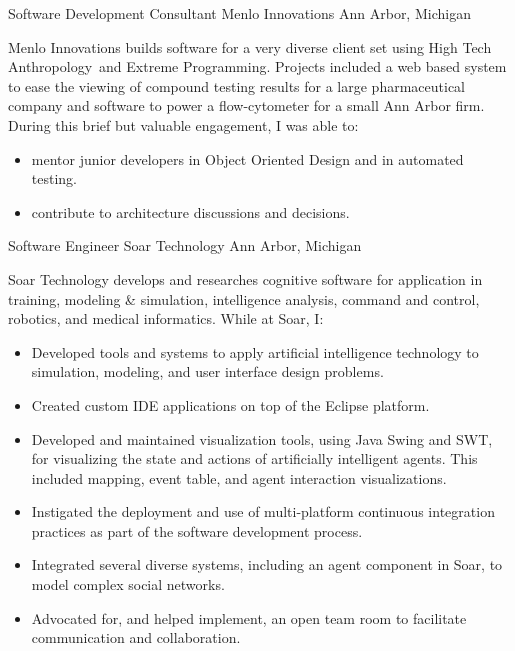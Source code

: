\documentclass[11pt,letterpaper]{moderncv}
\begin{document}
  {Software Development Consultant}
         {Menlo Innovations} {Ann Arbor, Michigan} {}
{
  Menlo Innovations builds software for a very diverse client set
  using High Tech Anthropology\textregistered \ and Extreme
  Programming.  Projects included a web based system to ease the
  viewing of compound testing results for a large pharmaceutical
  company and software to power a flow-cytometer for a small Ann Arbor
  firm.\newline
  During this brief but valuable engagement, I was able to:
  \begin{itemize}
    \item mentor junior developers in Object Oriented Design and in
      automated testing.
    \item contribute to architecture discussions and decisions.
  \end{itemize}
}

 {Software Engineer} {Soar Technology}
         {Ann Arbor, Michigan} {}
{
  Soar Technology develops and researches cognitive software for
  application in training, modeling \& simulation, intelligence
  analysis, command and control, robotics, and medical
  informatics.\newline
  While at Soar, I:
  \begin{itemize}
  \item Developed tools and systems to apply artificial intelligence
    technology to simulation, modeling, and user interface design
    problems.
   \item Created custom IDE applications on top of the Eclipse platform.
   \item Developed and maintained visualization tools, using Java
     Swing and SWT, for visualizing the state and actions of
     artificially intelligent agents. This included mapping, event
     table, and agent interaction visualizations.
   \item Instigated the deployment and use of multi-platform
     continuous integration practices as part of the software
     development process.
   \item Integrated several diverse systems, including an agent
     component in Soar, to model complex social networks.
   \item Advocated for, and helped implement, an open team room to
     facilitate communication and collaboration.
  \end{itemize}
}
\end{document}
